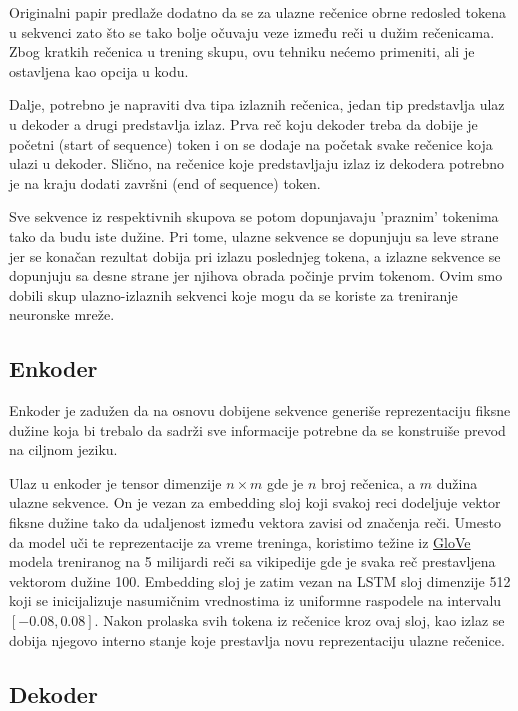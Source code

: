\documentclass[a4paper]{article}
\begin{document}
Originalni papir predlaže dodatno da se za ulazne rečenice obrne redosled tokena u sekvenci zato što se tako bolje očuvaju veze između reči u dužim rečenicama. Zbog kratkih rečenica u trening skupu, ovu tehniku nećemo primeniti, ali je ostavljena kao opcija u kodu.

Dalje, potrebno je napraviti dva tipa izlaznih rečenica, jedan tip predstavlja ulaz u dekoder a drugi predstavlja izlaz. Prva reč koju dekoder treba da dobije je početni (start of sequence) token i on se dodaje na početak svake rečenice koja ulazi u dekoder. Slično, na rečenice koje predstavljaju izlaz iz dekodera potrebno je na kraju dodati završni (end of sequence) token.

Sve sekvence iz respektivnih skupova se potom dopunjavaju 'praznim' tokenima tako da budu iste dužine. Pri tome, ulazne sekvence se dopunjuju sa leve strane jer se konačan rezultat dobija pri izlazu poslednjeg tokena, a izlazne sekvence se dopunjuju sa desne strane jer njihova obrada počinje prvim tokenom.
Ovim smo dobili skup ulazno-izlaznih sekvenci koje mogu da se koriste za treniranje neuronske mreže.

\subsection{Enkoder}

Enkoder je zadužen da na osnovu dobijene sekvence generiše reprezentaciju fiksne dužine koja bi trebalo da sadrži sve informacije potrebne da se konstruiše prevod na ciljnom jeziku.

Ulaz u enkoder je tensor dimenzije $n \times m$ gde je $n$ broj rečenica, a $m$ dužina ulazne sekvence. On je vezan za embedding sloj koji svakoj reci dodeljuje vektor fiksne dužine tako da udaljenost između vektora zavisi od značenja reči.
Umesto da model uči te reprezentacije za vreme treninga, koristimo težine iz \href{https://nlp.stanford.edu/projects/glove/}{GloVe} modela \cite{pennington2014glove} treniranog na 5 milijardi reči sa vikipedije gde je svaka reč prestavljena vektorom dužine 100. 
Embedding sloj je zatim vezan na LSTM sloj dimenzije 512 koji se inicijalizuje nasumičnim vrednostima iz uniformne raspodele na intervalu $[-0.08, 0.08]$.
Nakon prolaska svih tokena iz rečenice kroz ovaj sloj, kao izlaz se dobija njegovo interno stanje koje prestavlja novu reprezentaciju ulazne rečenice.

\subsection{Dekoder}
\end{document}
